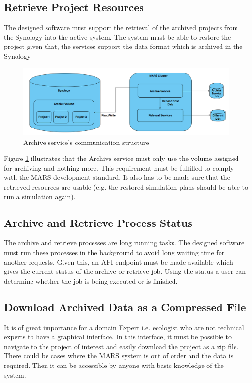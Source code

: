         \subsection{Retrieve Project Resources}    
            \label{ssec:retrieveAnalysis}
            The designed software must support the retrieval of the archived projects from the Synology into the active system. The
            system must be able to restore the project given that, the services support the data format which is archived in the Synology.
           
            \begin{figure}[H]
                \centering \includegraphics[scale=0.4]{grafiken/synology.png}
                \caption{Archive service's communication structure}
                \label{fig:synology}
            \end{figure}

            Figure \ref{fig:synology} illustrates that the Archive service must only use the volume assigned for archiving and nothing more. 
            This requirement must be fulfilled to comply with the MARS development standard. It also has to be made sure that the retrieved
            resources are usable (e.g. the restored simulation plans should be able to run a simulation again). 

        \subsection{Archive and Retrieve Process Status}  
            The archive and retrieve processes are long running tasks. The designed software must run these processes in the background to avoid 
            long waiting time for another requests. Given this, an API endpoint must be made available which gives the current status of the archive 
            or retrieve job. Using the status a user can determine whether the job is being executed or is finished.


        \subsection{Download Archived Data as a Compressed File}
        \label{sec:anaCompress}
            It is of great importance for a domain Expert i.e. ecologist who are not technical experts to have a graphical interface. In this interface,
            it must be possible to navigate to the project of interest and easily download the project as a zip file. There could be cases where the
            MARS system is out of order and the data is required. Then it can be accessible by anyone with basic knowledge of the system.
        
